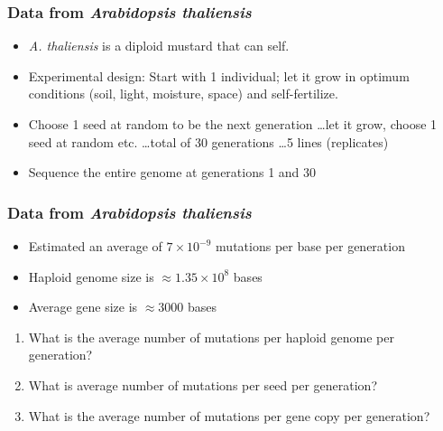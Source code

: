 \begin{frame}
    \frametitle{Data from \textit{Arabidopsis thaliensis}}
    \begin{itemize}
        \item<1-> \textit{A. thaliensis} is a diploid mustard that can self.

        \item<2-> Experimental design: Start with 1 individual; let it grow in
            optimum conditions (soil, light, moisture, space) and
            self-fertilize.

        \item<3-> Choose 1 seed at random to be the next generation \ldots let
            it grow, choose 1 seed at random etc. \ldots total of 30
            generations \ldots 5 lines (replicates)

        \item<4-> Sequence the entire genome at generations 1 and 30
    \end{itemize}
\end{frame}

\begin{frame}[t]
    \frametitle{Data from \textit{Arabidopsis thaliensis}}
    \begin{adjustwidth}{-1.5em}{-1.5em}
        \vspace{-3mm}
    \begin{itemize}
        \item<1-> Estimated an average of  $7 \times 10^{-9}$ mutations per base
            per generation

        \item<2-> Haploid genome size is $\approx 1.35 \times 10^8$ bases

        \item<3-> Average gene size is $\approx 3000$ bases
    \end{itemize}

    \begin{enumerate}
        \item<4-> What is the average number of mutations per haploid genome per
            generation?


            \vspace{3mm}
        \item<4-> What is average number of mutations per seed per generation?


            \vspace{3mm}
        \item<4-> What is the average number of mutations per gene copy per
            generation?

    \end{enumerate}
    \end{adjustwidth}
\end{frame}

